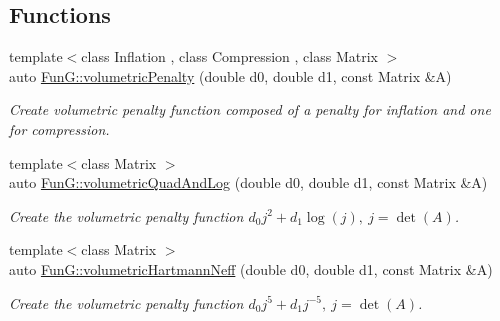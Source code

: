 \subsection*{Functions}
\begin{DoxyCompactItemize}
\item 
{\footnotesize template$<$class Inflation , class Compression , class Matrix $>$ }\\auto \hyperlink{namespaceFunG_ad26faeb264bb4b1cd7e70f3811c366c8}{Fun\-G\-::volumetric\-Penalty} (double d0, double d1, const Matrix \&A)
\begin{DoxyCompactList}\small\item\em Create volumetric penalty function composed of a penalty for inflation and one for compression. \end{DoxyCompactList}\item 
{\footnotesize template$<$class Matrix $>$ }\\auto \hyperlink{namespaceFunG_aaf30b9c36ed86e01b94f6b7c1d95cae8}{Fun\-G\-::volumetric\-Quad\-And\-Log} (double d0, double d1, const Matrix \&A)
\begin{DoxyCompactList}\small\item\em Create the volumetric penalty function $ d_0 j^2 + d_1 \log(j),\ j=\det(A) $. \end{DoxyCompactList}\item 
{\footnotesize template$<$class Matrix $>$ }\\auto \hyperlink{namespaceFunG_adf4be5df85ea9df10cc9e11c11aaeb7b}{Fun\-G\-::volumetric\-Hartmann\-Neff} (double d0, double d1, const Matrix \&A)
\begin{DoxyCompactList}\small\item\em Create the volumetric penalty function $ d_0 j^5 + d_1 j^{-5},\ j=\det(A) $. \end{DoxyCompactList}\end{DoxyCompactItemize}
